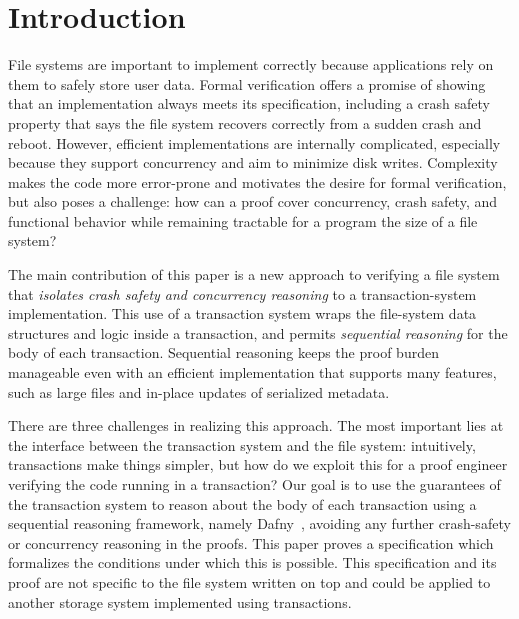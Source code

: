 \section{Introduction}

File systems are important to implement correctly because applications rely on
them to safely store user data. Formal verification offers a promise of showing
that an implementation always meets its specification, including a crash safety
property that says the file system recovers correctly from a sudden crash and
reboot. However, efficient implementations are internally complicated,
especially because they support concurrency and aim to minimize disk
writes.
Complexity makes the code more error-prone and motivates the desire for
formal verification, but also poses a challenge: how can a proof cover
concurrency, crash safety, and functional behavior while remaining tractable for
a program the size of a file system?


The main contribution of this paper is a new approach to verifying a file system that
\emph{isolates crash safety and concurrency reasoning} to a
transaction-system implementation. This use of a transaction system wraps the
file-system data structures and logic inside a transaction, and permits
\emph{sequential reasoning} for the body of each
transaction. Sequential reasoning keeps the proof burden manageable even
with an efficient implementation that supports many features, such as
large files and in-place updates of serialized metadata.

There are three challenges in realizing this approach. The most important lies
at the interface between the transaction system and the file system:
intuitively, transactions make things simpler, but how do we exploit this for a
proof engineer verifying the code running in a transaction? Our goal is to use
the guarantees of the transaction system to reason about the body of each
transaction using a sequential reasoning framework, namely Dafny~\cite{leino:dafny}, avoiding any
further crash-safety or concurrency reasoning in the proofs. This paper proves a
specification which formalizes the conditions under which this is possible. This
specification and its proof are not specific to the file system written on top
and could be applied to another storage system implemented using transactions.

